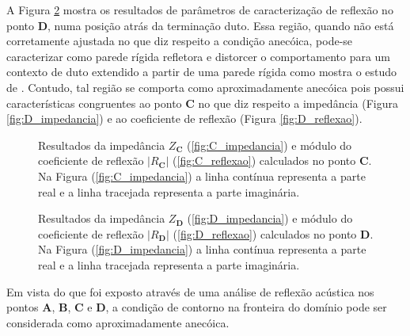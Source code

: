 A Figura \ref{fig:resultados_D} mostra os resultados de parâmetros de caracterização de reflexão no ponto \textbf{D}, numa posição atrás da terminação duto. Essa região, quando não está corretamente ajustada no que diz respeito a condição anecóica, pode-se caracterizar como parede rígida refletora e distorcer o comportamento para um contexto de duto extendido a partir de uma parede rígida como mostra o estudo de . Contudo, tal região se comporta como aproximadamente anecóica pois possui características congruentes ao ponto \textbf{C} no que diz respeito a impedância (Figura \ref{fig:D_impedancia}) e ao coeficiente de reflexão (Figura \ref{fig:D_reflexao}).

\begin{figure}
\begin{subfigure}{\scaleA \textwidth}
  
\end{subfigure}%
\begin{subfigure}{\scaleA \textwidth}
  
\end{subfigure}
\caption[Resultados de reflexão no ponto \textbf{C}]{Resultados da impedância $Z_{\textbf{C}}$ (\ref{fig:C_impedancia}) e módulo do coeficiente de reflexão $|R_{\textbf{C}}|$ (\ref{fig:C_reflexao}) calculados no ponto $\textbf{C}$. Na Figura (\ref{fig:C_impedancia}) a linha contínua representa a parte real e a linha tracejada representa a parte imaginária.}
\label{fig:resultados_C}
\end{figure}

\begin{figure}
\begin{subfigure}{\scaleA \textwidth}
  
\end{subfigure}%
\begin{subfigure}{\scaleA \textwidth}
  
\end{subfigure}
\caption[Resultados de reflexão no ponto \textbf{D}]{Resultados da impedância $Z_{\textbf{D}}$ (\ref{fig:D_impedancia}) e módulo do coeficiente de reflexão $|R_{\textbf{D}}|$ (\ref{fig:D_reflexao}) calculados no ponto $\textbf{D}$. Na Figura (\ref{fig:D_impedancia}) a linha contínua representa a parte real e a linha tracejada representa a parte imaginária.}
\label{fig:resultados_D}
\end{figure}

\newpage
Em vista do que foi exposto através de uma análise de reflexão acústica nos pontos \textbf{A}, \textbf{B}, \textbf{C} e \textbf{D}, a condição de contorno na fronteira do domínio pode ser considerada como aproximadamente anecóica.

